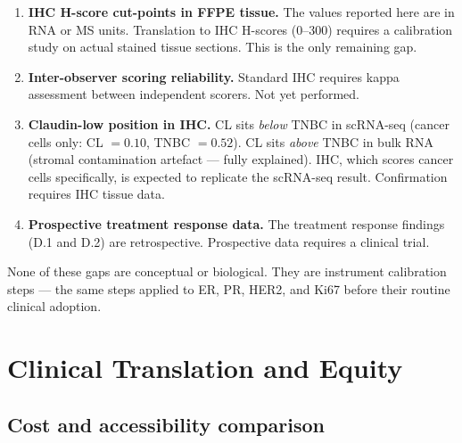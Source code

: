 \documentclass[12pt, a4paper]{article}
\begin{document}
\begin{enumerate}
  \item \textbf{IHC H-score cut-points in FFPE tissue.}
        The values reported here are in RNA or MS units.
        Translation to IHC H-scores ($0$--$300$) requires
        a calibration study on actual stained tissue sections.
        This is the only remaining gap.

  \item \textbf{Inter-observer scoring reliability.}
        Standard IHC requires kappa assessment between
        independent scorers. Not yet performed.

  \item \textbf{Claudin-low position in IHC.}
        CL sits \emph{below} TNBC in scRNA-seq
        (cancer cells only: CL $= 0.10$, TNBC $= 0.52$).
        CL sits \emph{above} TNBC in bulk RNA (stromal
        contamination artefact --- fully explained). IHC,
        which scores cancer cells specifically, is expected
        to replicate the scRNA-seq result. Confirmation
        requires IHC tissue data.

  \item \textbf{Prospective treatment response data.}
        The treatment response findings (D.1 and D.2) are
        retrospective. Prospective data requires a clinical
        trial.
\end{enumerate}

\noindent None of these gaps are conceptual or biological.
They are instrument calibration steps --- the same steps
applied to ER, PR, HER2, and Ki67 before their routine
clinical adoption.

\section{Clinical Translation and Equity}

\subsection{Cost and accessibility comparison}
\end{document}
